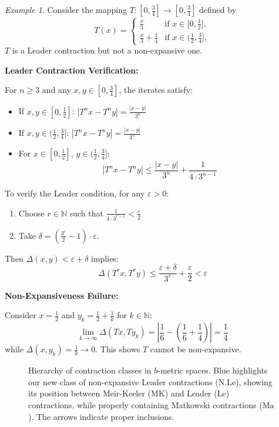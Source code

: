 \documentclass{birkjour}
\theoremstyle{definition}
\theoremstyle{remark}
\newtheorem{ex}{Example}
\numberwithin{equation}{section}
\begin{document}
\begin{ex}\label{leader-exm}
Consider the mapping $T\colon [0,\frac{3}{4}] \to [0,\frac{3}{4}]$ defined by
\[
T(x) = 
\begin{cases} 
\frac{x}{3} & \text{if } x \in \big[0, \frac{1}{2}\big], \\ 
\frac{x}{3} + \frac{1}{4} & \text{if } x \in \big(\frac{1}{2}, \frac{3}{4}\big],
\end{cases}
\]
$T$ is a Leader contraction but not a non-expansive one.

\noindent\textbf{Leader Contraction Verification:}

For $n \geq 3$ and any $x,y \in [0,\frac{3}{4}]$, the iterates satisfy:
\begin{itemize}
\item If $x,y \in [0,\frac{1}{2}]$: $|T^nx - T^ny| = \frac{|x-y|}{3^n}$
\item If $x,y \in (\frac{1}{2},\frac{3}{4}]$: $|T^nx - T^ny| = \frac{|x-y|}{3^n}$
\item For $x \in [0,\frac{1}{2}]$, $y \in (\frac{1}{2},\frac{3}{4}]$:
\[
|T^nx - T^ny| \leq \frac{|x-y|}{3^n} + \frac{1}{4\cdot 3^{n-1}}
\]
\end{itemize}

To verify the Leader condition, for any $\varepsilon > 0$:
\begin{enumerate}
\item Choose $r \in \mathbb{N}$ such that $\frac{1}{4\cdot 3^{r-1}} < \frac{\varepsilon}{2}$
\item Take $\delta =( \frac{3^r}{2}-1)\cdot \varepsilon$.
\end{enumerate}
Then $\Delta(x,y) < \varepsilon + \delta$ implies:
\[
\Delta(T^rx, T^ry) \leq \frac{\varepsilon + \delta}{3^r} + \frac{\varepsilon}{2} < \varepsilon
\]

\noindent\textbf{Non-Expansiveness Failure:}

Consider $x=\frac{1}{2}$ and $y_k=\frac{1}{2}+\frac{1}{k}$ for $k\in\mathbb{N}$:
\[
\lim_{k\to\infty} \Delta(Tx,Ty_k) = \left|\frac{1}{6}-\left(\frac{1}{6}+\frac{1}{4}\right)\right| = \frac{1}{4}
\]
while $\Delta(x,y_k) = \frac{1}{k} \to 0$. This shows $T$ cannot be non-expansive.
\end{ex} 

\begin{figure}[h]
\centering
{}
\caption{Hierarchy of contraction classes in $b$-metric spaces. Blue highlights our new class of non-expansive Leader contractions ($\mathrm{N.Le}$), showing its position between Meir-Keeler ($\mathrm{MK}$) and Leader ($\mathrm{Le}$) contractions, while properly containing Matkowski contractions ($\mathrm{Ma}$). The arrows indicate proper inclusions.}
\label{nle:diagram}
\end{figure}
\end{document}
